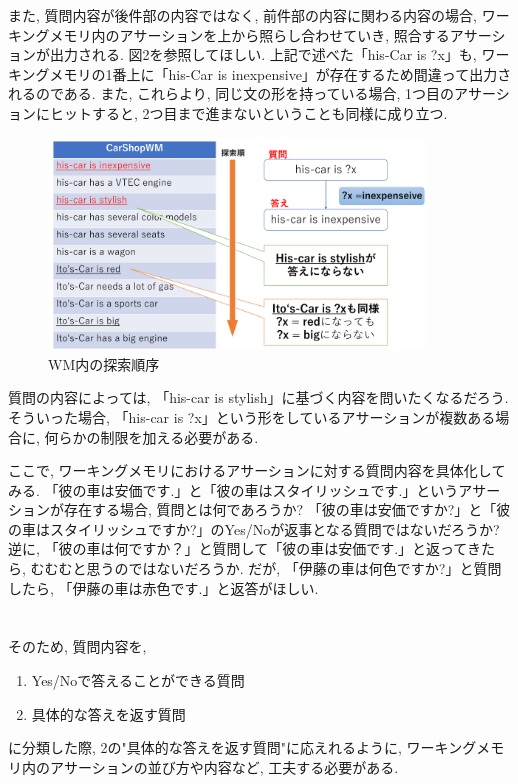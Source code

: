 \documentclass[uplatex,12pt]{jsarticle}
\begin{document}
また, 質問内容が後件部の内容ではなく, 前件部の内容に関わる内容の場合, ワーキングメモリ内のアサーションを上から照らし合わせていき, 照合するアサーションが出力される. 図2を参照してほしい. 上記で述べた「his-Car is ?x」も, ワーキングメモリの1番上に「his-Car is inexpensive」が存在するため間違って出力されるのである. また, これらより, 同じ文の形を持っている場合, 1つ目のアサーションにヒットすると, 2つ目まで進まないということも同様に成り立つ.

\begin{figure}[htbp]
 \begin{center}
  \includegraphics[width = 10cm, pagebox = cropbox, clip]{images/後ろ向き推論_WMの探索.pdf}
 \end{center}
 \caption[]{WM内の探索順序}\label{fig:fig1.1}
\end{figure}

質問の内容によっては, 「his-car is stylish」に基づく内容を問いたくなるだろう. そういった場合, 「his-car is ?x」という形をしているアサーションが複数ある場合に, 何らかの制限を加える必要がある.

ここで, ワーキングメモリにおけるアサーションに対する質問内容を具体化してみる. 「彼の車は安価です.」と「彼の車はスタイリッシュです.」というアサーションが存在する場合, 質問とは何であろうか? 「彼の車は安価ですか?」と「彼の車はスタイリッシュですか?」のYes/Noが返事となる質問ではないだろうか? 逆に, 「彼の車は何ですか？」と質問して「彼の車は安価です.」と返ってきたら, むむむと思うのではないだろうか. だが, 「伊藤の車は何色ですか?」と質問したら, 「伊藤の車は赤色です.」と返答がほしい. \\\\\\

そのため, 質問内容を, 
\begin{enumerate}
\item Yes/Noで答えることができる質問
\item 具体的な答えを返す質問
\end{enumerate}
に分類した際, 2の"具体的な答えを返す質問"に応えれるように, ワーキングメモリ内のアサーションの並び方や内容など, 工夫する必要がある.\\
\end{document}
